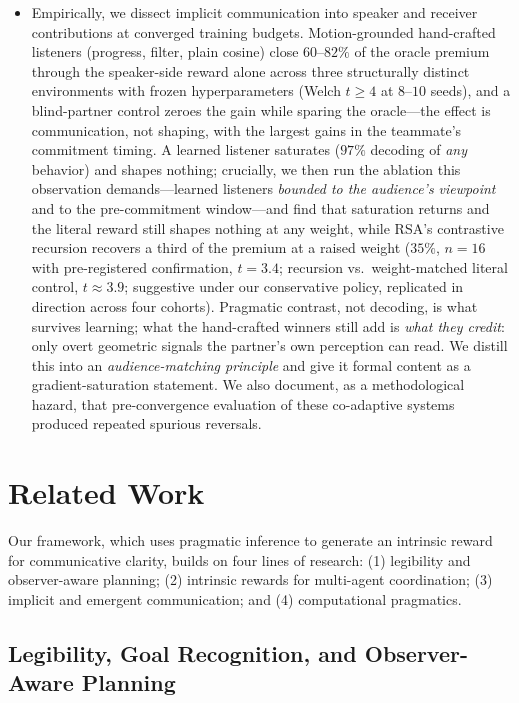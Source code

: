 \documentclass{article}
\begin{document}
\begin{itemize}
\item Empirically, we dissect implicit communication into speaker and receiver contributions at converged training budgets. Motion-grounded hand-crafted listeners (progress, filter, plain cosine) close $60$--$82\%$ of the oracle premium through the speaker-side reward alone across three structurally distinct environments with frozen hyperparameters (Welch $t \geq 4$ at $8$--$10$ seeds), and a blind-partner control zeroes the gain while sparing the oracle---the effect is communication, not shaping, with the largest gains in the teammate's commitment timing. A learned listener saturates ($97\%$ decoding of \emph{any} behavior) and shapes nothing; crucially, we then run the ablation this observation demands---learned listeners \emph{bounded to the audience's viewpoint} and to the pre-commitment window---and find that saturation returns and the literal reward still shapes nothing at any weight, while RSA's contrastive recursion recovers a third of the premium at a raised weight ($35\%$, $n{=}16$ with pre-registered confirmation, $t=3.4$; recursion vs.\ weight-matched literal control, $t\approx3.9$; suggestive under our conservative policy, replicated in direction across four cohorts). Pragmatic contrast, not decoding, is what survives learning; what the hand-crafted winners still add is \emph{what they credit}: only overt geometric signals the partner's own perception can read. We distill this into an \emph{audience-matching principle} and give it formal content as a gradient-saturation statement. We also document, as a methodological hazard, that pre-convergence evaluation of these co-adaptive systems produced repeated spurious reversals.
\end{itemize}

\section{Related Work}
\label{sec:related}

Our framework, which uses pragmatic inference to generate an intrinsic reward for communicative clarity, builds on four lines of research: (1) legibility and observer-aware planning; (2) intrinsic rewards for multi-agent coordination; (3) implicit and emergent communication; and (4) computational pragmatics.

\subsection{Legibility, Goal Recognition, and Observer-Aware Planning}
\end{document}
